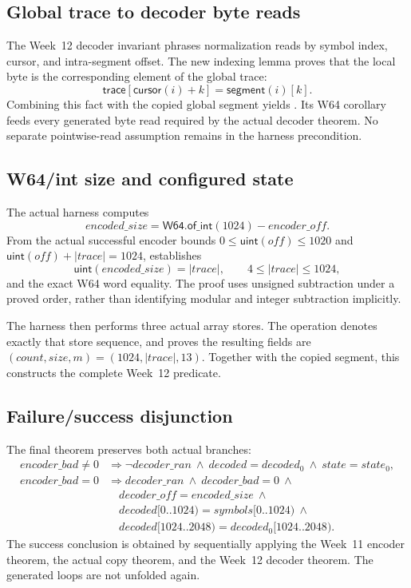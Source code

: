 \subsection*{Global trace to decoder byte reads}

The Week~12 decoder invariant phrases normalization reads by symbol index,
cursor, and intra-segment offset.  The new indexing lemma
 proves that the local byte is the
corresponding element of the global trace:
\[
\mathsf{trace}[\mathsf{cursor}(i)+k]
 = \mathsf{segment}(i)[k].
\]
Combining this fact with the copied global segment yields
.  Its W64
corollary feeds every generated byte read required by the actual decoder
theorem.  No separate pointwise-read assumption remains in the harness
precondition.

\subsection*{W64/int size and configured state}

The actual harness computes
\[
encoded\_size = \mathsf{W64.of\_int}(1024)-encoder\_off.
\]
From the actual successful encoder bounds
\(0\leq \mathsf{uint}(off)\leq 1020\) and
\(\mathsf{uint}(off)+|trace|=1024\),
 establishes
\[
\mathsf{uint}(encoded\_size)=|trace|,
\qquad
4\leq |trace|\leq 1024,
\]
and the exact W64 word equality.  The proof uses unsigned subtraction under a
proved order, rather than identifying modular and integer subtraction
implicitly.

The harness then performs three actual array stores.  The operation
 denotes exactly that store sequence, and
 proves the resulting fields are
\((count,size,m)=(1024,|trace|,13)\).  Together with the copied segment, this
constructs the complete Week~12
 predicate.

\subsection*{Failure/success disjunction}

The final theorem preserves both actual branches:
\[
\begin{array}{ll}
encoder\_bad\neq 0 &\Longrightarrow
  \neg decoder\_ran\ \land\ decoded=decoded_0\ \land\ state=state_0,\\[2mm]
encoder\_bad=0 &\Longrightarrow
  decoder\_ran\ \land\ decoder\_bad=0\ \land\\
&\quad decoder\_off=encoded\_size\ \land\\
&\quad decoded[0..1024)=symbols[0..1024)\ \land\\
&\quad decoded[1024..2048)=decoded_0[1024..2048).
\end{array}
\]
The success conclusion is obtained by sequentially applying the Week~11
encoder theorem, the actual copy theorem, and the Week~12 decoder theorem.
The generated loops are not unfolded again.

